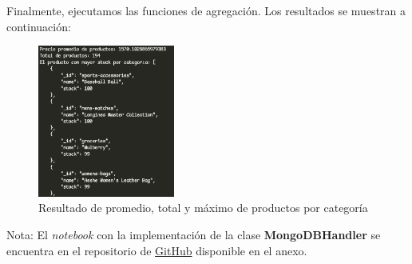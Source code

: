 Finalmente, ejecutamos las funciones de agregación. Los resultados se muestran a continuación:

\begin{figure}[H]
    \centering
    \includegraphics[width=0.4\textwidth]{./p2_agregadas.png}
    \caption{Resultado de promedio, total y máximo de productos por categoría}\label{fig:agregadas}
\end{figure}

Nota: El \textit{notebook} con la implementación de la clase \textbf{MongoDBHandler} se encuentra en el repositorio de \hyperref[repo]{GitHub} disponible
en el anexo.
